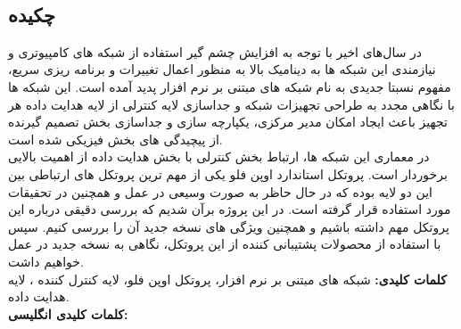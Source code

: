 
\setcounter{page}{1}
\thispagestyle{empty}

~\vfill

\subsection*{چکیده}
\begin{small}
\baselineskip=0.7cm

در سال‌های اخیر با توجه به افزایش چشم گیر استفاده از شبکه های کامپیوتری و نیازمندی این شبکه ها به دینامیک بالا به منظور اعمال تغییرات و برنامه ریزی سریع، مفهوم نسبتا جدیدی به نام شبکه های مبتنی بر نرم افزار  پدید آمده است. این شبکه ها با نگاهی مجدد به طراحی تجهیزات شبکه و جداسازی لایه کنترلی  از لایه هدایت داده  هر تجهیز باعث ایجاد امکان مدیر مرکزی، یکپارچه سازی و جداسازی بخش تصمیم گیرنده از پیچیدگی های بخش فیزیکی شده است.\\
در معماری این شبکه ها، ارتباط بخش کنترلی با بخش هدایت داده از اهمیت بالایی برخوردار است. پروتکل استاندارد اوپن فلو  یکی از مهم ترین پروتکل های ارتباطی بین این دو لایه بوده که در حال حاظر به صورت وسیعی در عمل و همچنین در تحقیقات مورد استفاده قرار گرفته است. در این پروژه برآن شدیم که بررسی دقیقی درباره این پروتکل مهم داشته باشیم و همچنین ویژگی های نسخه جدید آن را بررسی کنیم. سپس با استفاده از محصولات پشتیبانی کننده از این پروتکل، نگاهی به نسخه جدید در عمل خواهیم داشت.\\

\noindent\textbf{کلمات کلیدی:} شبکه های مبتنی بر نرم افزار، پروتکل اوپن فلو، لایه کنترل کننده ، لایه هدایت داده. \\
\noindent\textbf{کلمات کلیدی انگلیسی:} 
\\

\end{small}